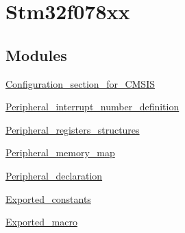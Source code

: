 \hypertarget{group__stm32f078xx}{}\section{Stm32f078xx}
\label{group__stm32f078xx}
\subsection*{Modules}
\begin{DoxyCompactItemize}
\item 
\hyperlink{group___configuration__section__for___c_m_s_i_s}{Configuration\+\_\+section\+\_\+for\+\_\+\+C\+M\+S\+IS}
\item 
\hyperlink{group___peripheral__interrupt__number__definition}{Peripheral\+\_\+interrupt\+\_\+number\+\_\+definition}
\item 
\hyperlink{group___peripheral__registers__structures}{Peripheral\+\_\+registers\+\_\+structures}
\item 
\hyperlink{group___peripheral__memory__map}{Peripheral\+\_\+memory\+\_\+map}
\item 
\hyperlink{group___peripheral__declaration}{Peripheral\+\_\+declaration}
\item 
\hyperlink{group___exported__constants}{Exported\+\_\+constants}
\item 
\hyperlink{group___exported__macro}{Exported\+\_\+macro}
\end{DoxyCompactItemize}
